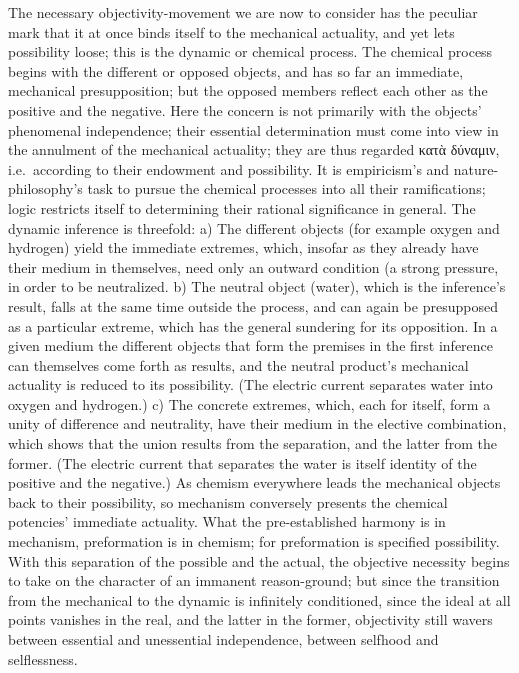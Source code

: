 \documentclass[12pt]{book}
\begin{document}
The necessary objectivity-movement we are now to consider has the peculiar
mark that it at once binds itself to the mechanical actuality, and yet lets
possibility loose; this is the dynamic or chemical process. The chemical
process begins with the different or opposed objects, and has so far an
immediate, mechanical presupposition; but the opposed members reflect each
other as the positive and the negative. Here the concern is not primarily
with the objects' phenomenal independence; their essential determination
must come into view in the annulment of the mechanical actuality; they are
thus regarded κατὰ δύναμιν, i.e.\ according to their endowment and
possibility. It is empiricism's and nature-philosophy's task to pursue the
chemical processes into all their ramifications; logic restricts itself to
determining their rational significance in general. The dynamic inference is
threefold: a) The different objects (for example oxygen and hydrogen) yield
the immediate extremes, which, insofar as they already have their medium in
themselves, need only an outward condition (a strong pressure, in order to
be neutralized. b) The neutral object (water), which is the inference's
result, falls at the same time outside the process, and can again be
presupposed as a particular extreme, which has the general sundering for its
opposition. In a given medium the different objects that form the premises
in the first inference can themselves come forth as results, and the neutral
product's mechanical actuality is reduced to its possibility. (The electric
current separates water into oxygen and hydrogen.) c) The concrete
extremes, which, each for itself, form a unity of difference and
neutrality, have their medium in the elective combination, which shows that
the union results from the separation, and the latter from the former. (The
electric current that separates the water is itself identity of the positive
and the negative.) As chemism everywhere leads the mechanical objects back
to their possibility, so mechanism conversely presents the chemical
potencies' immediate actuality. What the pre-established harmony is in
mechanism, preformation is in chemism; for preformation is specified
possibility. With this separation of the possible and the actual, the
objective necessity begins to take on the character of an immanent
reason-ground; but since the transition from the mechanical to the dynamic
is infinitely conditioned, since the ideal at all points vanishes in the
real, and the latter in the former, objectivity still wavers between
essential and unessential independence, between selfhood and selflessness.
\end{document}

